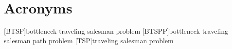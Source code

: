 \chapter*{Acronyms}
\begin{acronym}
  [BTSP]{bottleneck traveling salesman problem}
  [BTSPP]{bottleneck traveling salesman path problem}
  [TSP]{traveling salesman problem}
\end{acronym}